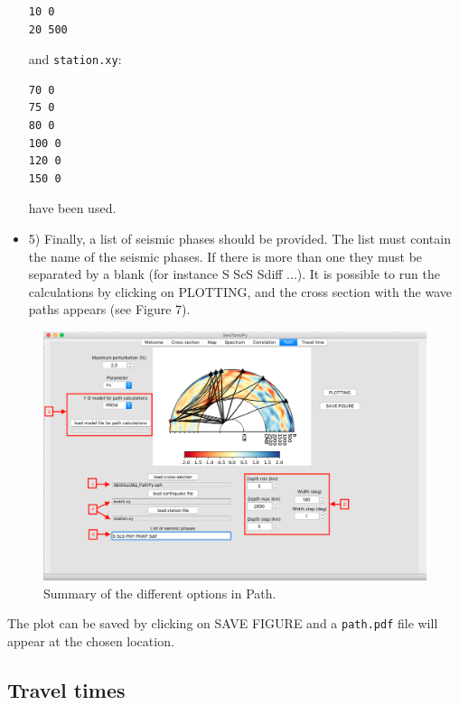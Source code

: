 \documentclass[12pt]{article}
\begin{document}
\begin{itemize}
\begin{verbatim}
10 0
20 500
\end{verbatim}

\newpage
and \verb|station.xy|:

\begin{verbatim}
70 0
75 0
80 0
100 0
120 0
150 0
\end{verbatim}
have been used.

\item 5) Finally,  a list of seismic
phases should be provided. The list must contain the name of the seismic phases. If there is more than one they must be separated by a blank (for instance S ScS Sdiff ...). It is possible to run the calculations by clicking on PLOTTING, and
the cross section with the wave paths appears (see Figure 7).
\end{itemize}

\begin{figure}
\begin{center}
\includegraphics[scale=0.35]{SeisTomoPy_notebook/figures/pathpy2.png}
\caption{Summary of the different options in Path.}
\label{pathpy2}
\end{center}
\end{figure}

The plot can be saved by clicking on SAVE FIGURE and a \verb?path.pdf? file
will appear at the chosen location.

\subsection{Travel times}\label{timepy}
\end{document}
